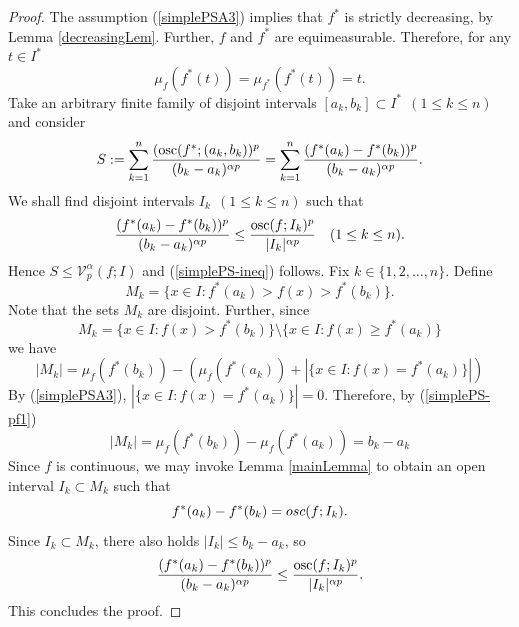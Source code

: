 \documentclass[10pt,a4paper]{amsart}
\DeclareMathOperator{\osc}{{\rm osc}}
\begin{document}
\begin{proof}
    The assumption (\ref{simplePSA3}) implies that $f^*$ is strictly decreasing, by Lemma \ref{decreasingLem}. Further, $f$ and $f^*$ are equimeasurable. Therefore, for any $t\in I^*$
    \begin{equation}
        \label{simplePS-pf1}
        \mu_f(f^*(t))=\mu_{f^*}(f^*(t))=t.
    \end{equation}
    Take an arbitrary finite family of disjoint intervals $[a_k,b_k]\subset I^*~~(1\le k\le n)$ and consider
    $$
    S:=\sum_{k=1}^n\frac{(\osc(f^*;(a_k,b_k))^p}{(b_k-a_k)^{\alpha p}}=\sum_{k=1}^n\frac{(f^*(a_k)-f^*(b_k))^p}{(b_k-a_k)^{\alpha p}}.
    $$
     We shall find disjoint intervals $I_k~~(1\le k\le n)$ such that
    \begin{equation}
        \label{ineq1}
        \frac{(f^*(a_k)-f^*(b_k))^p}{(b_k-a_k)^{\alpha p}}\le\frac{\osc(f;I_k)^p}{|I_k|^{\alpha p}}\quad(1\le k\le n).
    \end{equation}
    Hence $S\le\mathcal{V}_p^\alpha(f;I)$ and  (\ref{simplePS-ineq}) follows.
    Fix $k\in\{1,2,\ldots,n\}$. Define
    \begin{equation}
        \nonumber
        M_k=\{x\in I: f^*(a_k)>f(x)>f^*(b_k)\}.
    \end{equation}
    Note that the sets $M_k$ are disjoint. Further, since 
    \begin{equation}
        \nonumber
        M_k=\{x\in I:f(x)> f^*(b_k)\}\setminus\{x\in I:f(x)\ge f^*(a_k)\}
    \end{equation}
    we have
    \begin{equation}
        \nonumber
        |M_k|=\mu_f(f^*(b_k))-\left(\mu_f(f^*(a_k))+|\{x\in I:f(x)=f^*(a_k)\}|\right)
    \end{equation}
    By (\ref{simplePSA3}), $|\{x\in I:f(x)=f^*(a_k)\}|=0$. Therefore, by (\ref{simplePS-pf1})
    $$
        |M_k|=\mu_f(f^*(b_k))-\mu_f(f^*(a_k))=b_k-a_k
    $$
    Since $f$ is continuous, we may invoke Lemma \ref{mainLemma} to obtain an open interval $I_k\subset M_k$ such that
    \begin{equation}
        \nonumber
        f^*(a_k)-f^*(b_k)={\rm osc}(f;I_k).
    \end{equation}
    Since $I_k\subset M_k$, there also holds $|I_k|\le b_k-a_k$, so
    \begin{equation}
        \nonumber
        \frac{(f^*(a_k)-f^*(b_k))^p}{(b_k-a_k)^{\alpha p}}\le\frac{\osc(f;I_k)^p}{|I_k|^{\alpha p}}.
    \end{equation}
    This concludes the proof.
\end{proof}
\end{document}
